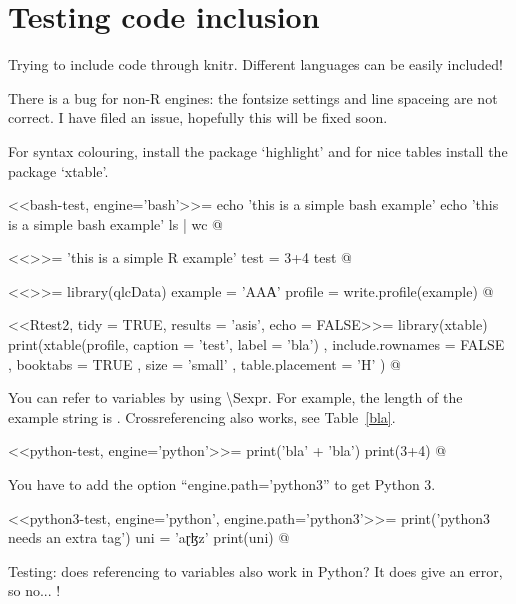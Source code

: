 \chapter{Testing code inclusion}


Trying to include code through knitr. 
Different languages can be easily 
included!

There is a bug for non-R engines: the fontsize settings and line spaceing are not correct. I have 
filed an issue, hopefully this will be fixed soon. 

For syntax colouring, install the package `highlight' and for nice tables 
install the package `xtable'.

<<bash-test, engine='bash'>>=
echo 'this is a simple bash example'
echo 'this is a simple bash example'
ls | wc
@

<<>>=
'this is a simple R example'
test = 3+4
test
@

<<>>=
library(qlcData)
example  = 'AΑА'
profile = write.profile(example)
@

<<Rtest2, tidy = TRUE, results = 'asis', echo = FALSE>>=
library(xtable)
print(xtable(profile, caption = 'test', label = 'bla')
  , include.rownames = FALSE
  , booktabs = TRUE
  , size = 'small'
  , table.placement = 'H'
  )
@



You can refer to variables by using \textbackslash Sexpr{}. 
For example, the length of the example string is .
Crossreferencing also works, see Table~\ref{bla}.

<<python-test, engine='python'>>=
print('bla' + 'bla')
print(3+4)
@

You have to add the option ``engine.path='python3'' to get Python 3.

<<python3-test, engine='python', engine.path='python3'>>=
print('python3 needs an extra tag')
uni = 'aɽɮz'
print(uni)
@

Testing: does referencing to variables also work in Python? It does give an error, so no... !